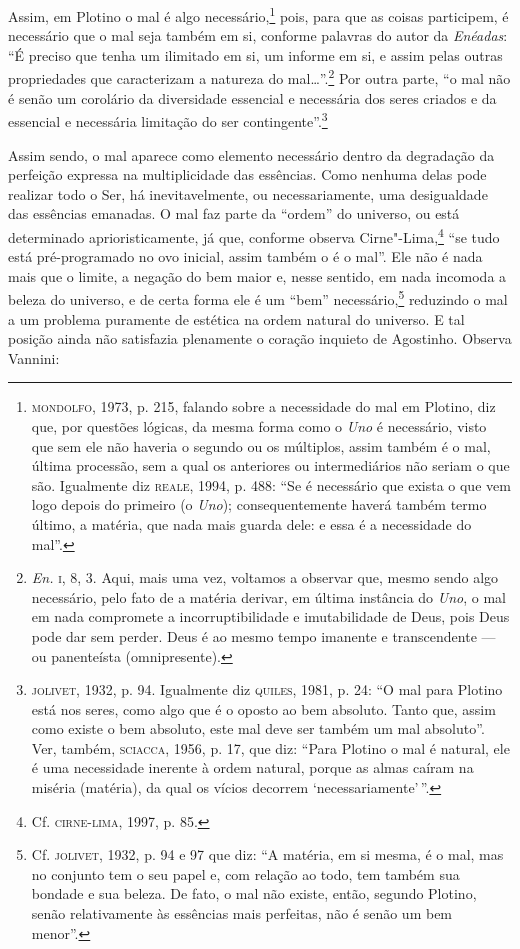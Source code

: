 Assim, em Plotino o mal é algo necessário,\footnote{ \textsc{mondolfo},
1973, p. 215, falando sobre a necessidade do mal em Plotino, diz
que, por questões lógicas, da mesma forma como o \emph{Uno} é
necessário, visto que sem ele não haveria o segundo ou os
múltiplos, assim também é o mal, última processão, sem a qual os
anteriores ou intermediários não seriam o que são. Igualmente
diz \textsc{reale}, 1994, p. 488: “Se é necessário que exista o que
vem logo depois do primeiro (o \emph{Uno}); consequentemente
haverá também termo último, a matéria, que nada mais guarda
dele: e essa é a necessidade do mal”.} pois, para que as
coisas participem, é necessário que o mal seja também em si,
conforme palavras do autor da \emph{Enéadas}: “É preciso que
tenha um ilimitado em si, um informe em si, e assim pelas outras
propriedades que caracterizam a natureza do mal\ldots{}”.\footnote{
\emph{En.} \textsc{i}, 8, 3. Aqui, mais uma vez, voltamos a observar
que, mesmo  sendo algo necessário, pelo fato de a matéria
derivar, em última instância do \emph{Uno}, o mal em nada
compromete a incorruptibilidade e imutabilidade de Deus, pois
Deus pode dar sem perder. Deus é ao mesmo tempo imanente e
transcendente --- ou panenteísta (omnipresente).} Por outra parte, “o
mal não é senão um corolário da diversidade essencial e
necessária dos seres criados e da essencial e necessária
limitação do ser contingente”.\footnote{ \textsc{jolivet}, 1932, p. 94.
Igualmente diz \textsc{quiles}, 1981, p. 24: “O mal para Plotino está nos
seres, como algo que é o oposto ao bem absoluto. Tanto que,
assim como existe o bem absoluto, este mal deve ser também um
mal absoluto”. Ver, também, \textsc{sciacca}, 1956, p. 17, que diz: “Para
Plotino o mal é natural, ele é uma necessidade inerente à ordem
natural, porque as almas caíram na miséria (matéria), da qual os
vícios decorrem ‘necessariamente'\,”.}

Assim sendo, o mal aparece como elemento necessário dentro da
degradação da perfeição expressa na multiplicidade das
essências. Como nenhuma delas pode realizar todo o Ser, há
inevitavelmente, ou necessariamente, uma desigualdade das
essências emanadas. O mal faz parte da “ordem” do universo, ou 
está  determinado  aprioristicamente, já que, conforme observa
Cirne"-Lima,\footnote{ Cf. \textsc{cirne}-\textsc{lima}, 1997, p. 85.}  ``se tudo
está pré-programado no ovo inicial, assim também o é o mal”. Ele
não é nada mais que o limite, a  negação do bem maior e, nesse
sentido, em nada incomoda a beleza do universo, e de certa forma
ele é um “bem” necessário,\footnote{ Cf. \textsc{jolivet}, 1932, p. 94 e
97 que diz: “A  matéria, em si mesma, é o mal, mas no conjunto
tem o seu papel e, com relação ao todo, tem também sua bondade e
sua beleza. De fato, o mal não existe, então, segundo Plotino,
senão relativamente às essências mais perfeitas, não é senão um
bem menor”.} reduzindo o mal a um problema puramente de
estética na ordem natural do universo.  E tal  posição ainda não
satisfazia plenamente o coração inquieto de Agostinho. Observa
Vannini: 

